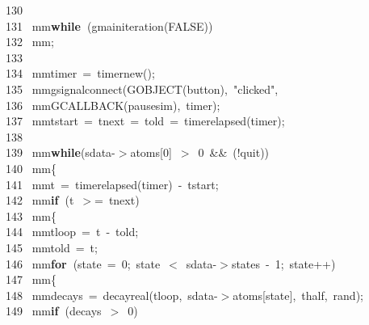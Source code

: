 \documentclass[10pt,a4paper]{article}
\newcommand{\hlstd}[1]{\textcolor[rgb]{0,0,0}{#1}}
\newcommand{\hlkey}[1]{\textcolor[rgb]{0,0,0}{\bf{#1}}}
\newcommand{\hlnum}[1]{\textcolor[rgb]{0.16,0.16,1}{#1}}
\newcommand{\hlstr}[1]{\textcolor[rgb]{1,0,0}{#1}}
\newcommand{\hlline}[1]{\textcolor[rgb]{0.33,0.33,0.33}{#1}}
\begin{document}
{}\hlline{\ 130\ }\hlstd{\mbox{}\\
}\hlline{\ 131\ }\hlstd{\hlstd{ mm}}\hlkey{while\ }\hlstd{(g\textunderscore main\textunderscore iteration(FALSE))\mbox{}\\
}\hlline{\ 132\ }\hlstd{\hlstd{ mm};\mbox{}\\
}\hlline{\ 133\ }\hlstd{\mbox{}\\
}\hlline{\ 134\ }\hlstd{\hlstd{ mm}timer\ =\ timer\textunderscore new();\mbox{}\\
}\hlline{\ 135\ }\hlstd{\hlstd{ mm}g\textunderscore signal\textunderscore connect(G\textunderscore OBJECT(button),\ }\hlstr{"clicked"}\hlstd{,\mbox{}\\
}\hlline{\ 136\ }\hlstd{\hlstd{ mm}G\textunderscore CALLBACK(pause\textunderscore sim),\ timer);\mbox{}\\
}\hlline{\ 137\ }\hlstd{\hlstd{ mm}tstart\ =\ tnext\ =\ told\ =\ timer\textunderscore elapsed(timer);\mbox{}\\
}\hlline{\ 138\ }\hlstd{\mbox{}\\
}\hlline{\ 139\ }\hlstd{\hlstd{ mm}}\hlkey{while}\hlstd{(sdata-$>$atoms[}\hlnum{0}\hlstd{]\ $>$\ }\hlnum{0\ }\hlstd{\&\&\ (!quit))\mbox{}\\
}\hlline{\ 140\ }\hlstd{\hlstd{ mm}\{\mbox{}\\
}\hlline{\ 141\ }\hlstd{\hlstd{ mm}t\ =\ timer\textunderscore elapsed(timer)\ -\ tstart;\mbox{}\\
}\hlline{\ 142\ }\hlstd{\hlstd{ mm}}\hlkey{if\ }\hlstd{(t\ $>$=\ tnext)\mbox{}\\
}\hlline{\ 143\ }\hlstd{\hlstd{ mm}\{\mbox{}\\
}\hlline{\ 144\ }\hlstd{\hlstd{ mm}tloop\ =\ t\ -\ told;\mbox{}\\
}\hlline{\ 145\ }\hlstd{\hlstd{ mm}told\ =\ t;\mbox{}\\
}\hlline{\ 146\ }\hlstd{\hlstd{ mm}}\hlkey{for\ }\hlstd{(state\ =\ }\hlnum{0}\hlstd{;\ state\ $<$\ sdata-$>$states\ }\hlnum{-\ 1}\hlstd{;\ state++)\mbox{}\\
}\hlline{\ 147\ }\hlstd{\hlstd{ mm}\{\mbox{}\\
}\hlline{\ 148\ }\hlstd{\hlstd{ mm}decays\ =\ decay\textunderscore real(tloop,\ sdata-$>$atoms[state],\ thalf,\ rand);\mbox{}\\
}\hlline{\ 149\ }\hlstd{\hlstd{ mm}}\hlkey{if\ }\hlstd{(decays\ $>$\ }\hlnum{0}\hlstd{)\mbox{}\\
}
\end{document}

